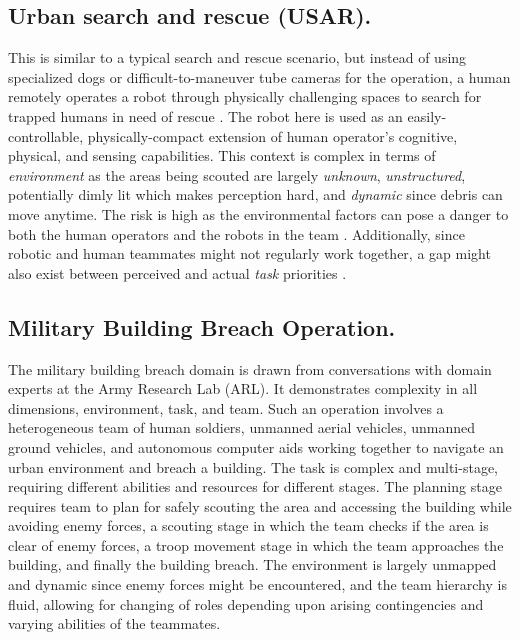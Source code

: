 \documentclass[letterpaper, 10 pt, conference]{ieeeconf}  %
\theoremstyle{definition}
\begin{document}
\subsection{Urban search and rescue (USAR).}
\label{subsec:usar}
        This is similar to a typical search and rescue scenario, but instead of using specialized dogs or difficult-to-maneuver tube cameras for the operation, a human remotely operates a robot through physically challenging spaces to search for trapped humans in need of rescue \cite{Casper2003}.
        The robot here is used as an easily-controllable, physically-compact extension of human operator's cognitive, physical, and sensing capabilities.
        This context is complex in terms of \textit{environment} as the areas being scouted are largely \textit{unknown},  \textit{unstructured}, potentially dimly lit which makes perception hard, and \textit{dynamic} since debris can move anytime.
        The risk is high as the environmental factors can pose a danger to both the human operators and the robots in the team \cite{Burke2004Miami, Karma2015}.
        Additionally, since robotic and human teammates might not regularly work together, a gap might also exist between perceived and actual \textit{task} priorities \cite{Casper2003}.
        
        
\subsection{Military Building Breach Operation.}
\label{subsec:mbb}
        The military building breach domain is drawn from conversations with domain experts at the Army Research Lab (ARL). It demonstrates complexity in all dimensions, environment, task, and team. Such an operation involves a heterogeneous team of human soldiers, unmanned aerial vehicles, unmanned ground vehicles, and autonomous computer aids working together to navigate an urban environment and breach a building. The task is complex and multi-stage, requiring different abilities and resources for different stages. The planning stage requires team to plan for safely scouting the area and accessing the building while avoiding enemy forces, a scouting stage in which the team checks if the area is clear of enemy forces, a troop movement stage in which the team approaches the building, and finally the building breach. The environment is largely unmapped and dynamic since enemy forces might be encountered, and the team hierarchy is fluid, allowing for changing of roles depending upon arising contingencies and varying abilities of the teammates.
        
\end{document}
